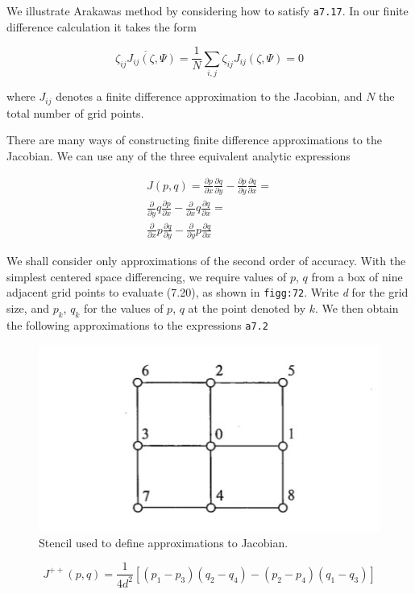 We illustrate Arakawa\textquotesingle s method by considering how to
satisfy \texttt{a7.17}. In our finite difference calculation it takes
the form

\[\overline{\zeta_{ij}J_{ij}(\zeta,\Psi)} = \frac{1}{N}\sum_{i,j}\zeta_{ij}J_{ij}(\zeta,\Psi) = 0\]

where \(J_{ij}\) denotes a finite difference approximation to the
Jacobian, and \(N\) the total number of grid points.

There are many ways of constructing finite difference approximations to
the Jacobian. We can use any of the three equivalent analytic
expressions

\[\begin{aligned}
J(p,q) = \frac{\partial p}{\partial x}\frac{\partial q}{\partial y} -
\frac{\partial p}{\partial y}\frac{\partial q}{\partial x} =\\
\frac{\partial }{\partial y}q\frac{\partial p}{\partial x} -
\frac{\partial }{\partial x}q\frac{\partial q}{\partial x} =\\
\frac{\partial }{\partial x}p\frac{\partial q}{\partial y} -
\frac{\partial }{\partial y}p\frac{\partial q}{\partial x}
\end{aligned}\]

We shall consider only approximations of the second order of accuracy.
With the simplest centered space differencing, we require values of
\(p\), \(q\) from a box of nine adjacent grid points to evaluate (7.20),
as shown in \texttt{figg:72}. Write \emph{d} for the grid size, and
\(p_{k}\), \(q_{k}\) for the values of \( p \), \(q\) at the point
denoted by \(k\). We then obtain the following approximations to the
expressions \texttt{a7.2}

\begin{figure}
\centering
\includegraphics[width = .7 \textwidth]{figs/NM/pic72.jpg}
\caption{Stencil used to define approximations to Jacobian.}
\end{figure}

\[J^{++}(p,q) = \frac{1}{4d^2} \left[ (p_1 - p_3)(q_2 - q_4) - (p_2-p_4)(q_1-q_3) \right]\]

